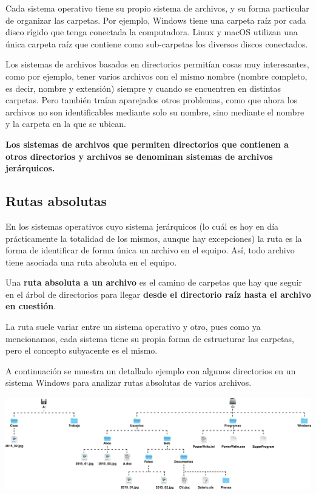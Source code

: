 Cada sistema operativo tiene su propio sistema de archivos, y su forma particular
de organizar las carpetas. Por ejemplo, Windows tiene una carpeta raíz por cada
disco rígido que tenga conectada la computadora. Linux y macOS utilizan una
única carpeta raíz que contiene como sub-carpetas los diversos discos conectados.

Los sistemas de archivos basados en directorios permitían cosas muy interesantes,
como por ejemplo, tener varios archivos con el mismo nombre (nombre completo,
es decir, nombre y extensión) siempre y cuando se encuentren en distintas
carpetas. Pero también traían aparejados otros problemas, como que ahora los
archivos no son identificables mediante solo su nombre, sino mediante el nombre
y la carpeta en la que se ubican.

\textbf{Los sistemas de archivos que permiten directorios que contienen a otros
directorios y archivos se denominan sistemas de archivos jerárquicos.}

\subsection{Rutas absolutas}

En los sistemas operativos cuyo sistema jerárquicos (lo cuál es hoy en día
prácticamente la totalidad de los mismos, aunque hay excepciones) la ruta es la
forma de identificar de forma única un archivo en el equipo. Así, todo archivo tiene
asociada una ruta absoluta en el equipo.

\begin{definition}
    Una \textbf{ruta absoluta a un archivo} es el camino de carpetas que hay que
    seguir en el árbol de directorios para llegar \textbf{desde el directorio raíz
    hasta el archivo en cuestión}.\autocite[vid.]{foldoc_absolute_2018}
\end{definition}

La ruta suele variar entre un sistema operativo y otro, pues como ya mencionamos,
cada sistema tiene su propia forma de estructurar las carpetas, pero el concepto
subyacente es el mismo.

A continuación se muestra un detallado ejemplo con algunos directorios en un
sistema Windows para analizar rutas absolutas de varios archivos.

\vspace{0.5cm}
\centerline{\includegraphics[scale=0.35]{capitulos/informatica/imagenes/directorios_windows_1.png}}

